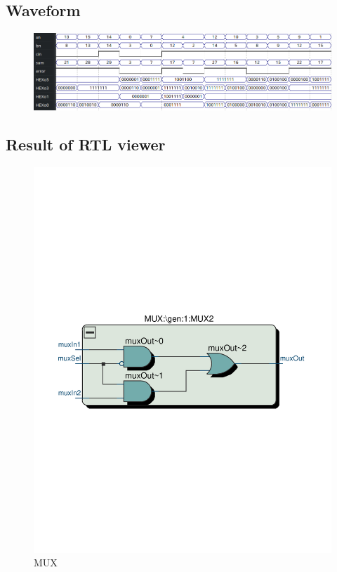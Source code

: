 \documentclass[13pt,a4paper]{report}
\begin{document}
\subsection{Waveform}
\begin{figure}[H]
\centering
\includegraphics[scale=0.7]{images/Exc2_waveform.png}
\end{figure}


\subsection{Result of RTL viewer}
\begin{figure}[H]
\centering
\includegraphics[scale=0.6, clip, trim={0cm 10.2cm 0cm 11.4cm}]{images/Exc2_MUX_RTL.pdf}
\caption*{MUX}
\end{figure}
\end{document}
